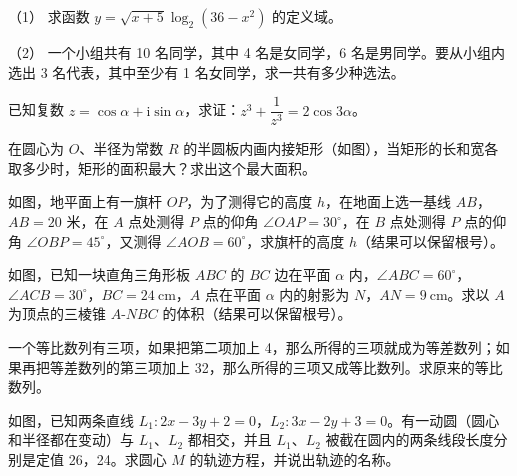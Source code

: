 \begin{question}

（1） 求函数 $y=\sqrt{x+5}\log_2(36-x^2)$ 的定义域。

（2） 一个小组共有 10 名同学，其中 4 名是女同学，6 名是男同学。要从小组内选出 3 名代表，其中至少有 1 名女同学，求一共有多少种选法。

\end{question}
\begin{question}
已知复数 $z=\cos\alpha+\mathrm i\sin\alpha$，求证：$z^3+\dfrac{1}{z^3}=2\cos3\alpha$。

\Needspace{0.4\textheight}
\end{question}
\begin{question}
在圆心为 $O$、半径为常数 $R$ 的半圆板内画内接矩形（如图），当矩形的长和宽各取多少时，矩形的面积最大？求出这个最大面积。
\nopagebreak[4]
\begin{center}\end{center}
\nopagebreak[4]
\Needspace{0.4\textheight}
\end{question}
\begin{question}
如图，地平面上有一旗杆 $OP$，为了测得它的高度 $h$，在地面上选一基线 $AB$，$AB=20$ 米，在 $A$ 点处测得 $P$ 点的仰角 $\angle OAP=30^\circ$，在 $B$ 点处测得 $P$ 点的仰角 $\angle OBP=45^\circ$，又测得 $\angle AOB=60^\circ$，求旗杆的高度 $h$（结果可以保留根号）。
\nopagebreak[4]
\begin{center}\end{center}
\nopagebreak[4]
\Needspace{0.4\textheight}
\end{question}
\begin{question}
如图，已知一块直角三角形板 $ABC$ 的 $BC$ 边在平面 $\alpha$ 内，$\angle ABC=60^\circ$，$\angle ACB=30^\circ$，$BC=24\ \mathrm{cm}$，$A$ 点在平面 $\alpha$ 内的射影为 $N$，$AN=9\ \mathrm{cm}$。求以 $A$ 为顶点的三棱锥 $A\text{-}NBC$ 的体积（结果可以保留根号）。
\nopagebreak[4]
\begin{center}\end{center}
\nopagebreak[4]
\end{question}
\begin{question}
一个等比数列有三项，如果把第二项加上 4，那么所得的三项就成为等差数列；如果再把等差数列的第三项加上 32，那么所得的三项又成等比数列。求原来的等比数列。

\Needspace{0.4\textheight}
\end{question}
\begin{question}
如图，已知两条直线 $L_1:2x-3y+2=0$，$L_2:3x-2y+3=0$。有一动圆（圆心和半径都在变动）与 $L_1$、$L_2$ 都相交，并且 $L_1$、$L_2$ 被截在圆内的两条线段长度分别是定值 26，24。求圆心 $M$ 的轨迹方程，并说出轨迹的名称。
\nopagebreak[4]
\begin{center}\end{center}
\nopagebreak[4]

\end{question}
